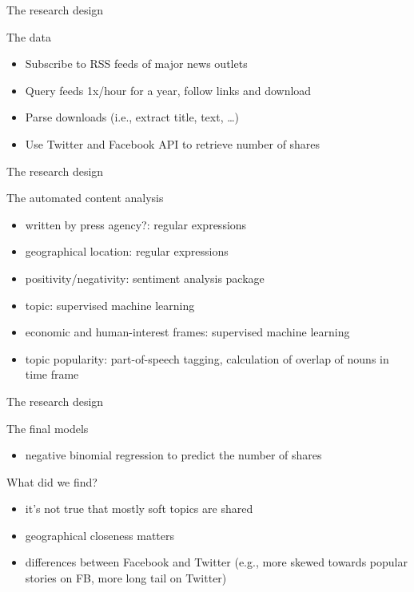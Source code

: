 \documentclass{beamer}
\begin{document}
\begin{frame}{The research design}
\begin{block}{The data}
	\begin{itemize}
		\item Subscribe to RSS feeds of major news outlets
		\item Query feeds 1x/hour for a year, follow links and download
		\item Parse downloads (i.e., extract title, text, \ldots)
		\item Use Twitter and Facebook API to retrieve number of shares
	\end{itemize}
\end{block}
\end{frame}



\begin{frame}{The research design}
	\begin{block}{The automated content analysis}
		\begin{itemize}
		\item written by press agency?: regular expressions
		\item geographical location: regular expressions
		\item positivity/negativity: sentiment analysis package
		\item topic: supervised machine learning
		\item economic and human-interest frames: supervised machine learning
		\item topic popularity: part-of-speech tagging, calculation of overlap of nouns in time frame
		\end{itemize}
	\end{block}
\end{frame}



\begin{frame}{The research design}
	\begin{block}{The final models}
		\begin{itemize}
		\item negative binomial regression to predict the number of shares
		\end{itemize}
	\end{block}
\end{frame}

\begin{frame}{What did we find?}
	\begin{itemize}
		\item it's not true that mostly soft topics are shared
		\item geographical closeness matters
		\item differences between Facebook and Twitter (e.g., more skewed towards popular stories on FB, more long tail on Twitter)
	\end{itemize}
\end{frame}
\end{document}
